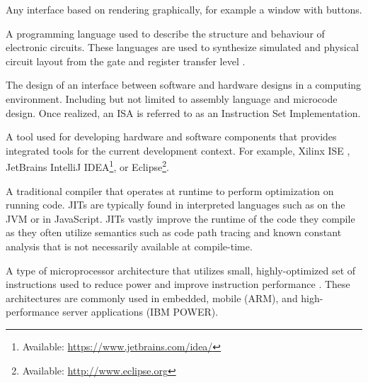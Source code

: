 \begin{definition}
Any interface based on rendering graphically, for example a window with buttons. 
\end{definition}

\begin{definition}
A programming language used to describe the structure and behaviour of electronic circuits. These languages are used to synthesize simulated and physical circuit layout from the gate and register transfer level \cite{Chu2006}.
\end{definition}

\begin{definition}
    The design of an interface between software and hardware designs in a computing environment. Including but not limited to assembly language and microcode design. Once realized, an ISA is referred to as an Instruction Set Implementation. 
\end{definition}

\begin{definition}
A tool used for developing hardware and software components that provides integrated tools for the current development context. For example, Xilinx ISE \cite{xilinxISE}, JetBrains IntelliJ IDEA\footnote{Available: \url{https://www.jetbrains.com/idea/}}, or Eclipse\footnote{Available: \url{http://www.eclipse.org}}.
\end{definition}

\begin{definition}
A traditional compiler that operates at runtime to perform optimization on running code. JITs are typically found in interpreted languages such as on the JVM or in JavaScript. JITs vastly improve the runtime of the code they compile as they often utilize semantics such as code path tracing and known constant analysis that is not necessarily available at compile-time. 
\end{definition}

\begin{definition}
    A type of microprocessor architecture that utilizes small, highly-optimized set of instructions used to reduce power and improve instruction performance \cite{Aletan1992, Stokes1999}. These architectures are commonly used in embedded, mobile (ARM), and high-performance server applications (IBM POWER). 
\end{definition}

